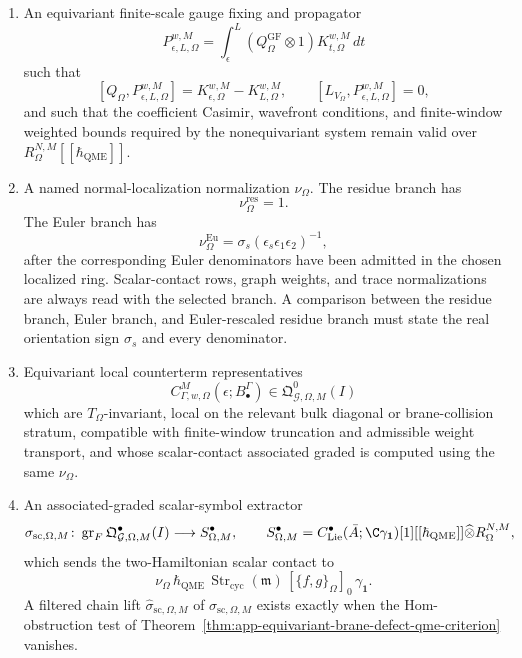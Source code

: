 \begin{defn}
\begin{enumerate}[label={(\(\Omega\arabic*\))}]
    \item An equivariant finite-scale gauge fixing and propagator
      \[
        P^{w,M}_{\epsilon,L,\Omega}
          =
        \int_\epsilon^L
          (Q^{\mathrm{GF}}_{\Omega}\otimes 1)K^{w,M}_{t,\Omega}\,dt
      \]
      such that
      \[
        [Q_\Omega,P^{w,M}_{\epsilon,L,\Omega}]
          =
        K^{w,M}_{\epsilon,\Omega}-K^{w,M}_{L,\Omega},
        \qquad
        [L_{V_\Omega},P^{w,M}_{\epsilon,L,\Omega}]=0,
      \]
      and such that the coefficient Casimir, wavefront conditions, and
      finite-window weighted bounds required by the nonequivariant system
      remain valid over \(R_\Omega^{N,M}[[\hbar_{\mathrm{QME}}]]\).

    \item A named normal-localization normalization
      \(\nu_\Omega\).  The residue branch has
      \[
        \nu_\Omega^{\mathrm{res}}=1.
      \]
      The Euler branch has
      \[
        \nu_\Omega^{\mathrm{Eu}}
          =
        \sigma_s(\epsilon_s\epsilon_1\epsilon_2)^{-1},
      \]
      after the corresponding Euler denominators have been admitted in the
      chosen localized ring.  Scalar-contact rows, graph weights, and trace
      normalizations are always read with the selected branch.  A comparison
      between the residue branch, Euler branch, and Euler-rescaled residue
      branch must state the real orientation sign \(\sigma_s\) and every
      denominator.

    \item Equivariant local counterterm representatives
      \[
        C^{M}_{\Gamma,w,\Omega}(\epsilon;B^\Gamma_\bullet)
        \in
        \mathfrak Q^0_{\mathcal G,\Omega,M}(I)
      \]
      which are \(T_\Omega\)-invariant, local on the relevant bulk
      diagonal or brane-collision stratum, compatible with
      finite-window truncation and admissible weight transport, and
      whose scalar-contact associated graded is computed using the same
      \(\nu_\Omega\).

    \item An associated-graded scalar-symbol extractor
      \[
        \sigma_{\mathrm{sc},\Omega,M}\colon
        \operatorname{gr}_{F}
        \mathfrak Q^\bullet_{\mathcal G,\Omega,M}(I)
        \longrightarrow
        S^\bullet_{\Omega,M},
        \qquad
        S^\bullet_{\Omega,M}
          =
        C^\bullet_{\mathrm{Lie}}
          (\bar A;\C\gamma_{\mathbf 1})[1]
          [[\hbar_{\mathrm{QME}}]]
          \widehat\otimes R_\Omega^{N,M},
      \]
      which sends the two-Hamiltonian scalar contact to
      \[
        \nu_\Omega\,
        \hbar_{\mathrm{QME}}\,
        \operatorname{Str}_{\mathrm{cyc}}(\mathfrak m)\,
        [\{f,g\}_\Omega]_0\,\gamma_{\mathbf 1}.
        \label{eq:app-omega-scalar-contact-symbol}
      \]
      A filtered chain lift
      \(\widehat\sigma_{\mathrm{sc},\Omega,M}\) of
      \(\sigma_{\mathrm{sc},\Omega,M}\) exists exactly when the
      Hom-obstruction test of
      Theorem~\ref{thm:app-equivariant-brane-defect-qme-criterion}
      vanishes.


\end{enumerate}
\end{defn}
